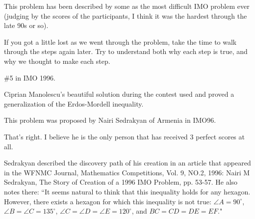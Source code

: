 
This problem has been described by some as the most difficult IMO problem ever (judging by the scores of the participants, I think it was the hardest through the late 90s or so).



If you got a little lost as we went through the problem, take the time to walk through the steps again later.  Try to understand both why each step is true, and why we thought to make each step.


\#5 in IMO 1996.

Ciprian Manolescu's beautiful solution during the contest used and proved a generalization of the Erdos-Mordell inequality.

This problem was proposed by Nairi Sedrakyan of Armenia in IMO96.


That's right. I believe he is the only person that has received 3 perfect scores at all.

Sedrakyan described the discovery path of his creation in an article that appeared in the WFNMC Journal, Mathematics Competitions, Vol. 9, NO.2, 1996: Nairi M Sedrakyan,  The Story of Creation of a 1996 IMO Problem, pp. 53-57. He also notes there: ``It seems natural to think that this inequality holds for any hexagon. However, there exists a hexagon for which this inequality is not true: $\angle A=90^\circ$, $\angle B=\angle C=135^\circ$, $\angle C=\angle D=\angle E=120^\circ$, and $BC=CD=DE=EF.$"


